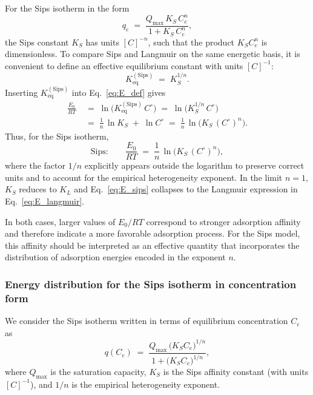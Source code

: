 	For the Sips isotherm in the form
	\begin{equation}
		q_e \;=\; \frac{Q_{\max}\,K_S\,C_e^{n}}{1 + K_S\,C_e^{n}},
	\end{equation}
	the Sips constant \(K_S\) has units \([C]^{-n}\), such that the product \(K_S C_e^{n}\) is dimensionless. To compare Sips and Langmuir on the same energetic basis, it is convenient to define an effective equilibrium constant with units \([C]^{-1}\):
	\begin{equation}
		K_{\mathrm{eq}}^{\mathrm{(Sips)}} \;=\; K_S^{1/n}.
	\end{equation}
	Inserting \(K_{\mathrm{eq}}^{\mathrm{(Sips)}}\) into Eq.~\eqref{eq:E_def} gives
	\begin{align}
		\frac{E_0}{RT}
		\;&=\; \ln\!\big(K_{\mathrm{eq}}^{\mathrm{(Sips)}}\,C^\circ\big)
		\;=\; \ln\!\big(K_S^{1/n}\,C^\circ\big) \nonumber\\[4pt]
		\;&=\; \frac{1}{n}\,\ln K_S \;+\; \ln C^\circ
		\;=\; \frac{1}{n}\,\ln\!\big(K_S\,(C^\circ)^{n}\big).
		\label{eq:E_sips}
	\end{align}
	Thus, for the Sips isotherm,
	\begin{equation}
		\text{Sips:}\qquad
		\frac{E_0}{RT} \;=\; \frac{1}{n}\,\ln\!\big(K_S\,(C^\circ)^{n}\big),
	\end{equation}
	where the factor \(1/n\) explicitly appears outside the logarithm to preserve correct units and to account for the empirical heterogeneity exponent. In the limit \(n = 1\), \(K_S\) reduces to \(K_L\) and Eq.~\eqref{eq:E_sips} collapses to the Langmuir expression in Eq.~\eqref{eq:E_langmuir}.
	
	In both cases, larger values of \(E_0/RT\) correspond to stronger adsorption affinity and therefore indicate a more favorable adsorption process. For the Sips model, this affinity should be interpreted as an effective quantity that incorporates the distribution of adsorption energies encoded in the exponent \(n\).
	
	\subsubsection{Energy distribution for the Sips isotherm in concentration form}
	
	We consider the Sips isotherm written in terms of equilibrium concentration
	\(C_e\) as
	\begin{equation}
		q(C_e)
		\;=\;
		\frac{Q_{\max}\,\bigl(K_S C_e\bigr)^{1/n}}
		{1 + \bigl(K_S C_e\bigr)^{1/n}},
		\label{eq:Sips_C}
	\end{equation}
	where \(Q_{\max}\) is the saturation capacity, \(K_S\) is the Sips affinity
	constant (with units \([C]^{-1}\)), and \(1/n\) is the empirical
	heterogeneity exponent.
	
